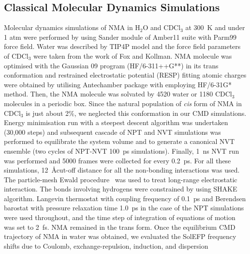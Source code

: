 \documentclass[b5paper,oneside,fleqn,11pt]{book}
\begin{document}
\begin{appendices}
\begin{refsection}
\subsection{Classical Molecular Dynamics Simulations}

Molecular dynamics simulations of NMA in H$_2$O and
CDCl$_3$ at 300~K and under 1 atm were performed by using
Sander module of {\sc Amber11} suite \citep{AMBER.11.2009} 
with Parm99 force field. \citep{Wang.Cieplak.Kollman.JCC.2000}
Water was described by TIP4P model \citep{Jorgensen.Chandrasekhar.Madura.Impey.Klein.JCP.1983} 
and the force field
parameters of CDCl$_3$ were taken from the work of Fox and
Kollman. \citep{Fox.Kollman.JPCB.1998} 
NMA molecule was optimised with the {\sc Gaussian 09}
program (HF/6-311++G**) in its trans conformation
and restrained electrostatic potential (RESP) fitting atomic
charges \citep{Bayly.Cieplak.Cornell.Kollman.JPC.1993} 
were obtained by utilising {\sc Antechamber} package \citep{Antechamber.JMGM.2006}
with employing HF/6-31G* method. \citep{Hariharan.Pople.TCA.1973} 
Then, the NMA
molecule was solvated by 4520 water or 1180 CDCl$_3$
molecules in a periodic box. Since the natural population of
\emph{cis} form of NMA in CDCl$_3$ is just about 2\%, we neglected this
conformation in our CMD simulations. \citep{Akiyama.Ohtani.SpectActA.1994}
Energy minimisation
run with a steepest descent algorithm was undertaken (30,000
steps) and subsequent cascade of NPT and NVT simulations
was performed to equilibrate the system volume and to
generate a canonical NVT ensemble (two cycles of NPT\hyp{}NVT
100~ps simulations). Finally, 1~ns NVT run was performed
and 5000 frames were collected for every 0.2~ps. For all these
simulations, 12~\AA cut\hyp{}off distance for all the non-bonding
interactions was used. The particle\hyp{}mesh Ewald 
procedure~\citep{Darden.York.Pedersen.JCP.1993}
was used to treat long\hyp{}range electrostatic interaction. The
bonds involving hydrogens were constrained by using SHAKE
algorithm. \citep{Ryckaert.Ciccotti.Berendsen.JComputPhys.1977} 
Langevin thermostat \citep{Izaguirre.Catarello.Wozniak.Skeel.JCP.2001}
with coupling frequency
of 0.1~ps and Berendsen barostat \citep{Berendsen.Postma.Gunsteren.DiNola.Haak.JCP.1984} 
with pressure relaxation
time 1.0~ps in the case of the NPT simulations were used
throughout, and the time step of integration of equations of
motion was set to 2~fs. NMA remained in the trans form.
Once the equilibrium CMD trajectory of NMA in water
was obtained, we evaluated the SolEFP frequency shifts due
to Coulomb, exchange\hyp{}repulsion, induction, and dispersion

\end{refsection}
\end{appendices}
\end{document}
